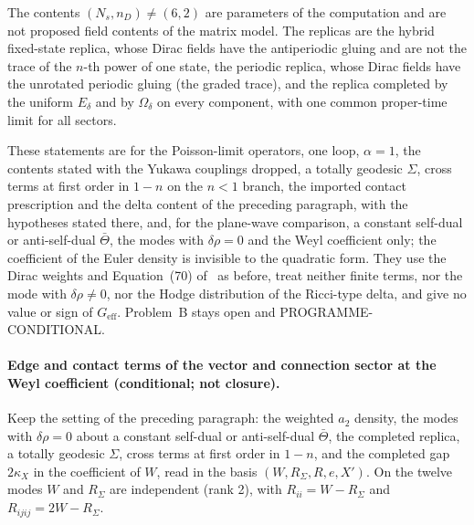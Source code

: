 The contents \((N_s,n_D)\neq(6,2)\) are parameters of the computation and are not proposed field contents of the matrix model. The replicas are the hybrid fixed-state replica, whose Dirac fields have the antiperiodic gluing and are not the trace of the \(n\)-th power of one state, the periodic replica, whose Dirac fields have the unrotated periodic gluing (the graded trace), and the replica completed by the uniform \(E_\delta\) and by \(\Omega_\delta\) on every component, with one common proper-time limit for all sectors.



These statements are for the Poisson-limit operators, one loop, \(\alpha=1\), the contents stated with the Yukawa couplings dropped, a totally geodesic \(\Sigma\), cross terms at first order in \(1-n\) on the \(n<1\) branch, the imported contact prescription and the delta content of the preceding paragraph, with the hypotheses stated there, and, for the plane-wave comparison, a constant self-dual or anti-self-dual \(\bar\Theta\), the modes with \(\delta\rho=0\) and the Weyl coefficient only; the coefficient of the Euler density is invisible to the quadratic form. They use the Dirac weights and Equation~(70) of~\cite{Solodukhin2011} as before, treat neither finite terms, nor the mode with \(\delta\rho\neq0\), nor the Hodge distribution of the Ricci-type delta, and give no value or sign of \(G_{\mathrm{eff}}\). Problem~B stays open and PROGRAMME-CONDITIONAL.





\paragraph{Edge and contact terms of the vector and connection sector at the Weyl coefficient (conditional; not closure).} \label{detail:sec-B-paragraphedgeandcontacttermsof-9}

Keep the setting of the preceding paragraph: the weighted \(a_2\) density, the modes with \(\delta\rho=0\) about a constant self-dual or anti-self-dual \(\bar\Theta\), the completed replica, a totally geodesic \(\Sigma\), cross terms at first order in \(1-n\), and the completed gap \(2\kappa_X\) in the coefficient of \(W\), read in the basis \((W,R_\Sigma,R,e,X')\). On the twelve modes \(W\) and \(R_\Sigma\) are independent (rank 2), with \(R_{ii}=W-R_\Sigma\) and \(R_{ijij}=2W-R_\Sigma\).



